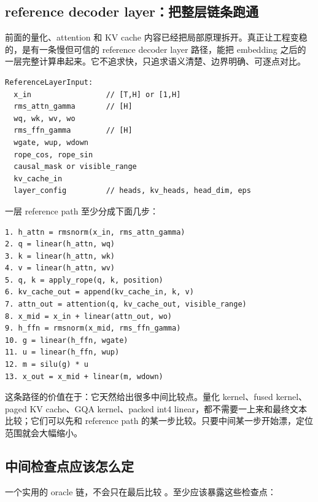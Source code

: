 \subsection{reference decoder layer：把整层链条跑通}

前面的量化、attention 和 KV cache 内容已经把局部原理拆开。真正让工程变稳的，是有一条慢但可信的 reference decoder layer 路径，能把 embedding 之后的一层完整计算串起来。它不追求快，只追求语义清楚、边界明确、可逐点对比。

\begin{lstlisting}[numbers=none,caption={reference decoder layer 的最小输入}]
ReferenceLayerInput:
  x_in                 // [T,H] or [1,H]
  rms_attn_gamma       // [H]
  wq, wk, wv, wo
  rms_ffn_gamma        // [H]
  wgate, wup, wdown
  rope_cos, rope_sin
  causal_mask or visible_range
  kv_cache_in
  layer_config         // heads, kv_heads, head_dim, eps
\end{lstlisting}

一层 reference path 至少分成下面几步：

\begin{lstlisting}[numbers=none,caption={reference decoder layer 的语义步骤}]
1. h_attn = rmsnorm(x_in, rms_attn_gamma)
2. q = linear(h_attn, wq)
3. k = linear(h_attn, wk)
4. v = linear(h_attn, wv)
5. q, k = apply_rope(q, k, position)
6. kv_cache_out = append(kv_cache_in, k, v)
7. attn_out = attention(q, kv_cache_out, visible_range)
8. x_mid = x_in + linear(attn_out, wo)
9. h_ffn = rmsnorm(x_mid, rms_ffn_gamma)
10. g = linear(h_ffn, wgate)
11. u = linear(h_ffn, wup)
12. m = silu(g) * u
13. x_out = x_mid + linear(m, wdown)
\end{lstlisting}

这条路径的价值在于：它天然给出很多中间比较点。量化 kernel、fused kernel、paged KV cache、GQA kernel、packed int4 linear，都不需要一上来和最终文本比较；它们可以先和 reference path 的某一步比较。只要中间某一步开始漂，定位范围就会大幅缩小。

\subsection{中间检查点应该怎么定}

一个实用的 oracle 链，不会只在最后比较 。至少应该暴露这些检查点：


